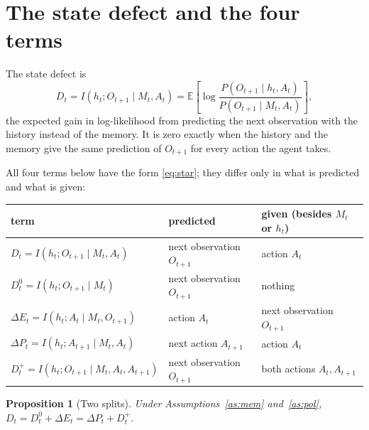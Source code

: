 \documentclass{article}
\newtheorem{proposition}{Proposition}
\theoremstyle{definition}
\theoremstyle{remark}
\newcommand{\E}{\mathbb{E}}
\newcommand{\dE}{\Delta E}
\newcommand{\dP}{\Delta P}
\begin{document}
\section{The state defect and the four terms}

The state defect is
\[
D_t=I(h_t;O_{t+1}\mid M_t,A_t)=\E\left[\log\frac{P(O_{t+1}\mid h_t,A_t)}{P(O_{t+1}\mid M_t,A_t)}\right],
\]
the expected gain in log-likelihood from predicting the next observation with the history instead of the memory. It is zero exactly when the history and the memory give the same prediction of $O_{t+1}$ for every action the agent takes.

All four terms below have the form \eqref{eq:star}; they differ only in what is predicted and what is given:

\begin{center}
\begin{tabular}{lll}
\toprule
term & predicted & given (besides $M_t$ or $h_t$)\\
\midrule
$D_t=I(h_t;O_{t+1}\mid M_t,A_t)$ & next observation $O_{t+1}$ & action $A_t$\\
$D^0_t=I(h_t;O_{t+1}\mid M_t)$ & next observation $O_{t+1}$ & nothing\\
$\dE_t=I(h_t;A_t\mid M_t,O_{t+1})$ & action $A_t$ & next observation $O_{t+1}$\\
$\dP_t=I(h_t;A_{t+1}\mid M_t,A_t)$ & next action $A_{t+1}$ & action $A_t$\\
$D^+_t=I(h_t;O_{t+1}\mid M_t,A_t,A_{t+1})$ & next observation $O_{t+1}$ & both actions $A_t,A_{t+1}$\\
\bottomrule
\end{tabular}
\end{center}

\begin{proposition}[Two splits]\label{prop:splits}
Under Assumptions~\ref{as:mem} and~\ref{as:pol}, $D_t=D^0_t+\dE_t=\dP_t+D^+_t$.
\end{proposition}
\end{document}
